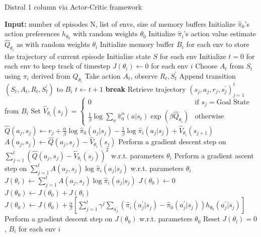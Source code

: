 \documentclass[12pt]{report}
\begin{document}
\begin{algorithm}[H]
\caption{Distral 1 column via Actor-Critic framework}\label{alg:dist1colAC}
\small
\begin{algorithmic}[1]
\State \textbf{Input: } number of episodes N, list of envs, size of memory buffers
\State Initialize $\hat{\pi}_0$'s action preferences $h_{\theta_0}$ with random weights $\theta_0$
\State Initialize $\hat{\pi}_i$'s action value estimate $\hat{Q}_{\theta_i}$ as with random weights $\theta_i$
\State Initialize memory buffer $B_i$ for each env to store the trajectory of current episode
\State Initialize state $S$ for each env
\State Initialize $t = 0$ for each env to keep track of timestep
\State $J(\theta_i) \gets 0$ for each env $i$
\State Choose $A_t$ from $S_t$ using $\pi_i$ derived from $Q_{\theta_i}$ \label{peusdo:AC} 
\State Take action $A_t$, observe $R_t, S_t^\prime$
\State Append transition $(S_t,A_t,R_t,S_t^\prime)$ to $B_i$
\State $t \gets t + 1$
\State \textbf{break}
\Else {}
\EndIf
\EndFor
\State Retrieve trajectory $(s_j,a_j,r_j,s_j^\prime)_{j=1}^t$ from $B_i$ 
\State Set $\hat{V}_{\theta_i}(s_j) = \begin{cases} 0 &\mbox{if } s_j = \text{Goal State} \\
\frac{1}{\beta} \log \sum_a \hat{\pi}_0^\alpha (a|s_t) \exp(\beta \hat{Q}_{\theta_i})  & \mbox{otherwise} \end{cases} $
\State $\hat{Q}(a_j,s_j) \gets r_j + \frac{\alpha}{\beta}\log \hat{\pi}_0(a_j|s_j)-\frac{1}{\beta}\log \hat{\pi}_i(a_j|s_j) + \hat{V}_{\theta_i}(s_{j+1})$
\State $A(a_j, s_j) \gets \hat{Q}(a_j,s_j) - \hat{V}_{\theta_i}(s_j)$
\EndFor
\State Perform a gradient descent step on $\sum_{j=1}^t\left(\hat{Q}(a_j,s_j) - \hat{V}_{\theta_i}(s_j)\right)^2$ w.r.t. parameters $\theta_i$
\State Perform a gradient ascent step on $\sum_{j=1}^t A(a_j, s_j)\log \hat{\pi}_i(a_j|s_j)$ w.r.t. parameters $\theta_i$
\State $J(\theta_i) \gets \sum_{j=1}^t A(a_j, s_j)\log \hat{\pi}_i(a_j|s_j)$
\EndFor
\State $J(\theta_0) \gets 0$
 
\State $J(\theta_0) \gets J(\theta_0) + J(\theta_i)$
\State $J(\theta_0) \gets J(\theta_0) + \frac{\alpha}{\beta}\left[\sum_{j=1}^t \gamma^j \sum_{a^\prime_j}(\hat{\pi}_i(a^\prime_j|s_j)-\hat{\pi}_0(a^\prime_j|s_j))h_{\theta_0}(a^\prime_j|s_j)\right]$ 
\EndFor
\State Perform a gradient descent step on $J(\theta_0)$ w.r.t. parameters $\theta_0$
\State Reset $J(\theta_i) = 0$, $B_i$ for each env $i$
\EndWhile\label{euclidendwhile}
\end{algorithmic}
\end{algorithm}
\end{document}
